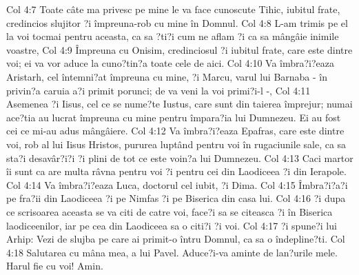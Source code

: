 Col 4:7  Toate câte ma privesc pe mine le va face cunoscute Tihic, iubitul frate, credincios slujitor ?i împreuna-rob cu mine în Domnul.
Col 4:8  L-am trimis pe el la voi tocmai pentru aceasta, ca sa ?ti?i cum ne aflam ?i ca sa mângâie inimile voastre,
Col 4:9  Împreuna cu Onisim, credinciosul ?i iubitul frate, care este dintre voi; ei va vor aduce la cuno?tin?a toate cele de aici.
Col 4:10  Va îmbra?i?eaza Aristarh, cel întemni?at împreuna cu mine, ?i Marcu, varul lui Barnaba - în privin?a caruia a?i primit porunci; de va veni la voi primi?i-l -,
Col 4:11  Asemenea ?i Iisus, cel ce se nume?te Iustus, care sunt din taierea împrejur; numai ace?tia au lucrat împreuna cu mine pentru împara?ia lui Dumnezeu. Ei au fost cei ce mi-au adus mângâiere.
Col 4:12  Va îmbra?i?eaza Epafras, care este dintre voi, rob al lui Iisus Hristos, pururea luptând pentru voi în rugaciunile sale, ca sa sta?i desavâr?i?i ?i plini de tot ce este voin?a lui Dumnezeu.
Col 4:13  Caci martor îi sunt ca are multa râvna pentru voi ?i pentru cei din Laodiceea ?i din Ierapole.
Col 4:14  Va îmbra?i?eaza Luca, doctorul cel iubit, ?i Dima.
Col 4:15  Îmbra?i?a?i pe fra?ii din Laodiceea ?i pe Nimfas ?i pe Biserica din casa lui.
Col 4:16  ?i dupa ce scrisoarea aceasta se va citi de catre voi, face?i sa se citeasca ?i în Biserica laodiceenilor, iar pe cea din Laodiceea sa o citi?i ?i voi.
Col 4:17  ?i spune?i lui Arhip: Vezi de slujba pe care ai primit-o întru Domnul, ca sa o îndepline?ti.
Col 4:18  Salutarea cu mâna mea, a lui Pavel. Aduce?i-va aminte de lan?urile mele. Harul fie cu voi! Amin.


